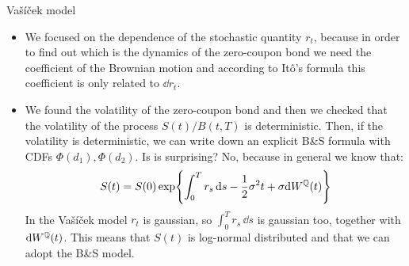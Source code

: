 \begin{example}{Vašíček model}{}{}
\begin{itemize}
        \item We focused on the dependence of the stochastic quantity $r_t$, because in order to find out which is the dynamics of the zero-coupon bond we need the coefficient of the Brownian motion and according to Itô's formula this coefficient is only related to $\dd r_t$.
        \item We found the volatility of the zero-coupon bond and then we checked that the volatility of the process $S(t)/B(t,T)$ is deterministic. Then, if the volatility is deterministic, we can write down an explicit B\&S formula with CDFs $\Phi(d_1),\Phi(d_2)$. Is is surprising? No, because in general we know that:
        \begin{equation*}
            S(t) = S(0)\exp{\int_0^T r_s\,\dd s - \frac{1}{2}\sigma^2 t + \sigma\dd W^{\mathbb{Q}}(t)}
        \end{equation*}
        In the Vašíček model $r_t$ is gaussian, so $\int_0^T r_s\,\dd s$ is gaussian too, together with $\dd W^{\mathbb{Q}}(t)$. This means that $S(t)$ is log-normal distributed and that we can adopt the B\&S model.
    \end{itemize}
\end{example}
